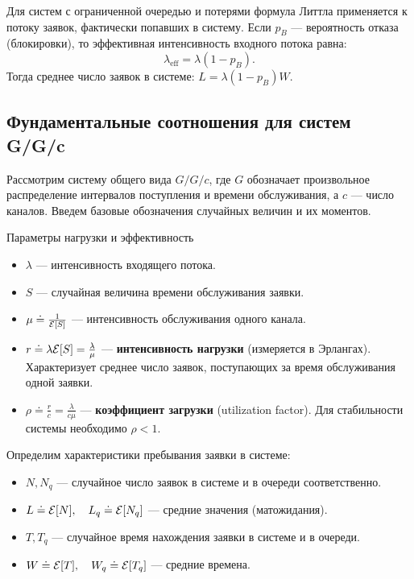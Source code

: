 \begin{note}
Для систем с ограниченной очередью и потерями формула Литтла применяется к потоку заявок, фактически попавших в систему. Если $p_B$ — вероятность отказа (блокировки), то эффективная интенсивность входного потока равна:
$$ \lambda_{\text{eff}} = \lambda (1 - p_B). $$
Тогда среднее число заявок в системе: $L = \lambda(1 - p_B) W$.
\end{note}

\subsection{Фундаментальные соотношения для систем G/G/c}

Рассмотрим систему общего вида $G/G/c$, где $G$ обозначает произвольное распределение интервалов поступления и времени обслуживания, а $c$ — число каналов. Введем базовые обозначения случайных величин и их моментов.

\begin{definition}{Параметры нагрузки и эффективность}
\begin{itemize}
    \item $\lambda$ — интенсивность входящего потока.
    \item $S$ — случайная величина времени обслуживания заявки.
    \item $\mu \doteq \frac{1}{\mathcal{E}[S]}$ — интенсивность обслуживания одного канала.
    \item $r \doteq \lambda \mathcal{E}[S] = \frac{\lambda}{\mu}$ — \textbf{интенсивность нагрузки} (измеряется в Эрлангах). Характеризует среднее число заявок, поступающих за время обслуживания одной заявки.
    \item $\rho \doteq \frac{r}{c} = \frac{\lambda}{c\mu}$ — \textbf{коэффициент загрузки} (utilization factor). Для стабильности системы необходимо $\rho < 1$.
\end{itemize}
\end{definition}

Определим характеристики пребывания заявки в системе:

\begin{itemize}
    \item $N, N_q$ — случайное число заявок в системе и в очереди соответственно.
    \item $L \doteq \mathcal{E}[N], \quad L_q \doteq \mathcal{E}[N_q]$ — средние значения (матожидания).
    \item $T, T_q$ — случайное время нахождения заявки в системе и в очереди.
    \item $W \doteq \mathcal{E}[T], \quad W_q \doteq \mathcal{E}[T_q]$ — средние времена.
\end{itemize}

